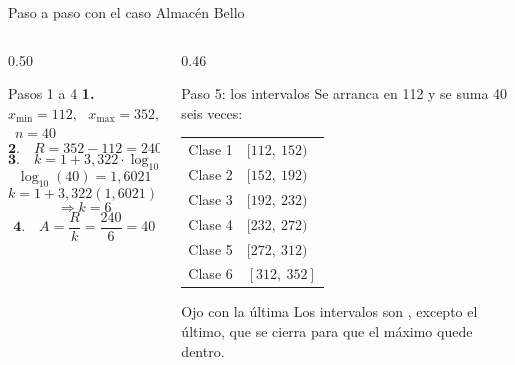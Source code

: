 \documentclass[aspectratio=169,10pt]{beamer}
\begin{document}
\begin{frame}{Paso a paso con el caso Almacén Bello}
  \footnotesize
  \begin{columns}[T,onlytextwidth]
    \begin{column}{0.50\textwidth}
      \begin{block}{Pasos 1 a 4}
        \scriptsize
        \textbf{1.} $x_{\min}=112$, \ $x_{\max}=352$, \ $n=40$
        \vspace{0.1cm}
        \[ \textbf{2.}\quad R = 352 - 112 = 240 \]
        \[ \textbf{3.}\quad k = 1 + 3{,}322\cdot\log_{10}(40) \]
        \[ \log_{10}(40)=1{,}6021 \]
        \[ k = 1 + 3{,}322(1{,}6021)=1+5{,}322=6{,}32 \]
        \[ \Rightarrow k = 6 \]
        \[ \textbf{4.}\quad A = \frac{R}{k} = \frac{240}{6} = 40 \]
      \end{block}
    \end{column}
    \begin{column}{0.46\textwidth}
      \begin{exampleblock}{Paso 5: los intervalos}
        \scriptsize
        Se arranca en 112 y se suma 40 seis veces:
        \vspace{0.1cm}
        \begin{tabular}{@{}ll@{}}
          Clase 1 & $[112,\ 152)$ \\
          Clase 2 & $[152,\ 192)$ \\
          Clase 3 & $[192,\ 232)$ \\
          Clase 4 & $[232,\ 272)$ \\
          Clase 5 & $[272,\ 312)$ \\
          Clase 6 & $[312,\ 352]$ \\
        \end{tabular}
      \end{exampleblock}
      \begin{alertblock}{Ojo con la última}
        \scriptsize
        Los intervalos son , excepto el último, que se cierra para que el máximo quede
        dentro.
      \end{alertblock}
    \end{column}
  \end{columns}
\end{frame}
\end{document}
